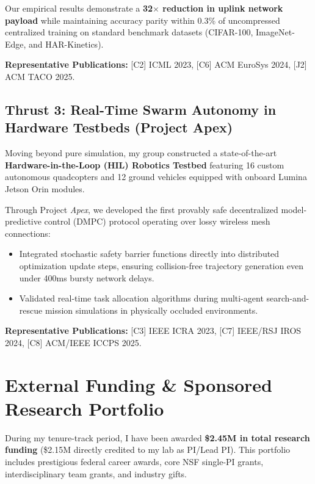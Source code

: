\documentclass[11pt, a4paper, parskip=half]{scrartcl}
\begin{document}
Our empirical results demonstrate a \textbf{32$\times$ reduction in uplink network payload} while maintaining accuracy parity within 0.3\% of uncompressed centralized training on standard benchmark datasets (CIFAR-100, ImageNet-Edge, and HAR-Kinetics).

\textbf{Representative Publications:} [C2] ICML 2023, [C6] ACM EuroSys 2024, [J2] ACM TACO 2025.

\subsection{Thrust 3: Real-Time Swarm Autonomy in Hardware Testbeds (Project Apex)}

Moving beyond pure simulation, my group constructed a state-of-the-art \textbf{Hardware-in-the-Loop (HIL) Robotics Testbed} featuring 16 custom autonomous quadcopters and 12 ground vehicles equipped with onboard Lumina Jetson Orin modules.

Through Project \textit{Apex}, we developed the first provably safe decentralized model-predictive control (DMPC) protocol operating over lossy wireless mesh connections:
\begin{itemize}
  \item Integrated stochastic safety barrier functions directly into distributed optimization update steps, ensuring collision-free trajectory generation even under 400ms bursty network delays.
  \item Validated real-time task allocation algorithms during multi-agent search-and-rescue mission simulations in physically occluded environments.
\end{itemize}

\textbf{Representative Publications:} [C3] IEEE ICRA 2023, [C7] IEEE/RSJ IROS 2024, [C8] ACM/IEEE ICCPS 2025.

\section{External Funding \& Sponsored Research Portfolio}

During my tenure-track period, I have been awarded \textbf{\$2.45M in total research funding} (\$2.15M directly credited to my lab as PI/Lead PI). This portfolio includes prestigious federal career awards, core NSF single-PI grants, interdisciplinary team grants, and industry gifts.
\end{document}
